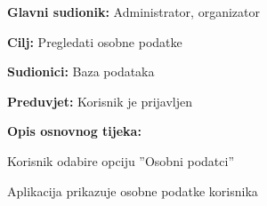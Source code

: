 					\noindent {}
					\begin{packed_item}

						\item \textbf{Glavni sudionik: } Administrator, organizator
						\item  \textbf{Cilj:} Pregledati osobne podatke
						\item  \textbf{Sudionici:} Baza podataka
						\item  \textbf{Preduvjet:} Korisnik je prijavljen
						\item  \textbf{Opis osnovnog tijeka:}

						\item[] \begin{packed_enum}

							\item Korisnik odabire opciju ”Osobni podatci”
							\item Aplikacija prikazuje osobne podatke korisnika
						\end{packed_enum}



					\end{packed_item}

